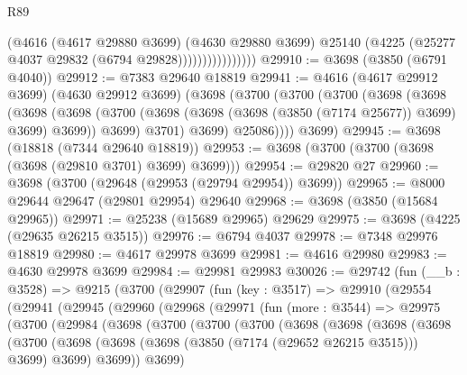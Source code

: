 \begin{lexlean}{R89}
\begin{coremodule}
                            (@4616
                              (@4617 @29880 @3699)
                              (@4630 @29880 @3699)
                              @25140
                              (@4225 (@25277 @4037 @29832 (@6794 @29828))))))))))))))))
@29910 := @3698 (@3850 (@6791 @4040))
@29912 := @7383 @29640 @18819
@29941 := @4616
    (@4617 @29912 @3699)
    (@4630 @29912 @3699)
    (@3698
      (@3700
        (@3700
          (@3700
            (@3698
              (@3698
                (@3698
                  (@3698
                    (@3700 (@3698 (@3698 (@3698 (@3850 (@7174 @25677)) @3699) @3699) @3699))
                    @3699)
                  @3701)
                @3699)
              @25086))))
      @3699)
@29945 := @3698 (@18818 (@7344 @29640 @18819))
@29953 := @3698 (@3700 (@3700 (@3698 (@3698 (@29810 @3701) @3699) @3699)))
@29954 := @29820 @27
@29960 := @3698 (@3700 (@29648 (@29953 (@29794 @29954)) @3699))
@29965 := @8000 @29644 @29647 (@29801 @29954) @29640
@29968 := @3698 (@3850 (@15684 @29965))
@29971 := @25238 (@15689 @29965) @29629
@29975 := @3698 (@4225 (@29635 @26215 @3515))
@29976 := @6794 @4037
@29978 := @7348 @29976 @18819
@29980 := @4617 @29978 @3699
@29981 := @4616 @29980
@29983 := @4630 @29978 @3699
@29984 := @29981 @29983
@30026 := @29742
    (fun (__b : @3528) =>
    @9215
      (@3700
        (@29907
          (fun (key : @3517) =>
          @29910
            (@29554
              (@29941
                (@29945
                  (@29960
                    (@29968
                      (@29971
                        (fun (more : @3544) =>
                        @29975
                          (@3700
                            (@29984
                              (@3698
                                (@3700
                                  (@3700
                                    (@3700
                                      (@3698
                                        (@3698
                                          (@3698
                                            (@3698
                                              (@3700
                                                (@3698
                                                  (@3698
                                                    (@3698
                                                      (@3850 (@7174 (@29652 @26215 @3515)))
                                                      @3699)
                                                    @3699)
                                                  @3699))
                                              @3699)

\end{coremodule}
\end{lexlean}
